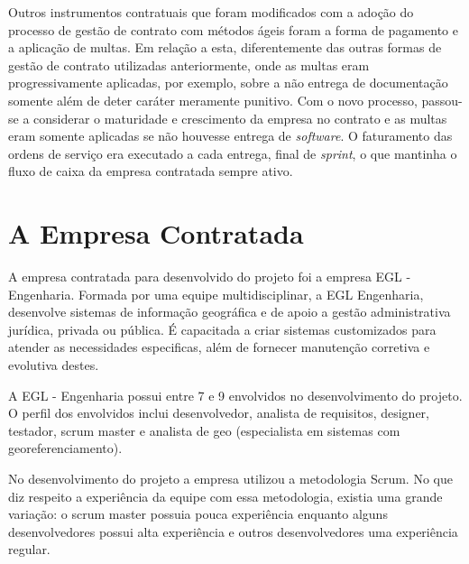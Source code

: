 Outros instrumentos contratuais que foram modificados com a adoção do processo de gestão de contrato com métodos ágeis foram a forma de pagamento e a aplicação de multas. Em relação a esta, diferentemente das outras formas de gestão de contrato utilizadas anteriormente, onde as multas eram progressivamente aplicadas, por exemplo, sobre a não entrega de documentação somente além de deter caráter meramente punitivo. Com o novo processo, passou-se a considerar o maturidade e crescimento da empresa no contrato e as multas eram somente aplicadas se não houvesse entrega de \textit{software}. O faturamento das ordens de serviço era executado a cada entrega, final de \textit{sprint}, o que mantinha o fluxo de caixa da empresa contratada sempre ativo. 


\section[A Empresa Contratada]{A Empresa Contratada}

A empresa contratada para desenvolvido do projeto foi a empresa EGL - Engenharia. Formada por uma equipe multidisciplinar, a EGL Engenharia, desenvolve sistemas de informação geográfica e de apoio a gestão administrativa jurídica, privada ou pública. É capacitada a criar sistemas customizados para atender as necessidades especificas, além de fornecer manutenção corretiva e evolutiva destes.

A EGL - Engenharia possui entre 7 e 9 envolvidos no desenvolvimento do projeto. O perfil dos envolvidos inclui desenvolvedor, analista de requisitos, designer, testador, scrum master e analista de geo (especialista em sistemas com georeferenciamento).

No desenvolvimento do projeto a empresa utilizou a metodologia Scrum. No que diz respeito a experiência da equipe com essa metodologia, existia uma grande variação: o scrum master possuia pouca experiência enquanto alguns desenvolvedores possui alta experiência e outros desenvolvedores uma experiência regular.

